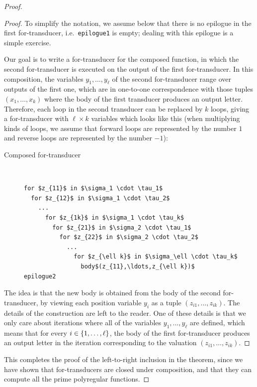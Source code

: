 \begin{proof}
\begin{proof}
    To simplify the notation, we assume below that there is no epilogue in the first for-transducer, i.e.~{\tt epilogue1} is empty; dealing with this epilogue is a simple exercise.   
 
Our goal is to write a for-transducer for the composed function, in which the second for-transducer is executed on the output of the first for-transducer. In this composition, the variables $y_1,\ldots,y_\ell$ of the second for-transducer range  over outputs of the first one, which are in one-to-one correspondence with those tuples $(x_1,\ldots,x_k)$ where the body of the first transducer produces an output letter. Therefore, each loop in the second transducer can be replaced by $k$ loops, giving a for-transducer with $\ell \times k$ variables 
which looks like this (when multiplying kinds of loops, we assume that forward loops are represented by the number $1$ and reverse loops are represented by the number $-1$):
\begin{description}
  \item[Composed for-transducer] \ 
                \begin{lstlisting}
for $z_{11}$ in $\sigma_1 \cdot \tau_1$
  for $z_{12}$ in $\sigma_1 \cdot \tau_2$
    ...
      for $z_{1k}$ in $\sigma_1 \cdot \tau_k$
        for $z_{21}$ in $\sigma_2 \cdot \tau_1$
          for $z_{22}$ in $\sigma_2 \cdot \tau_2$
            ...
              for $z_{\ell k}$ in $\sigma_\ell \cdot \tau_k$
                body$(z_{11},\ldots,z_{\ell k})$
epilogue2
            \end{lstlisting}
          \end{description}
  The idea is that the new body is obtained from the body of the second for-transducer, by viewing each position variable $y_i$ as a tuple $(z_{i1},\ldots,z_{ik})$. 
   The details of the construction are left to the reader. One of these details is that we only care about iterations where all of the variables $y_1,\ldots,y_\ell$ are defined, which means that for every $i \in \{1,\ldots,\ell\}$, the body of the first for-transducer produces an output letter in the iteration corresponding to the valuation $(z_{i1},\ldots,z_{ik})$. 
\end{proof}

This completes the proof of the left-to-right inclusion in the theorem, since we have shown that for-transducers are closed under composition, and that they can compute all the prime polyregular functions.


\end{proof}
